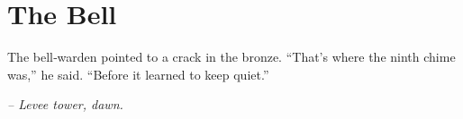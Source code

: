 \chapter*{The Bell}

The bell‑warden pointed to a crack in the bronze. “That’s where the ninth chime was,” he said. “Before it learned to keep quiet.”

\smallskip

\noindent \textit{– Levee tower, dawn.}


